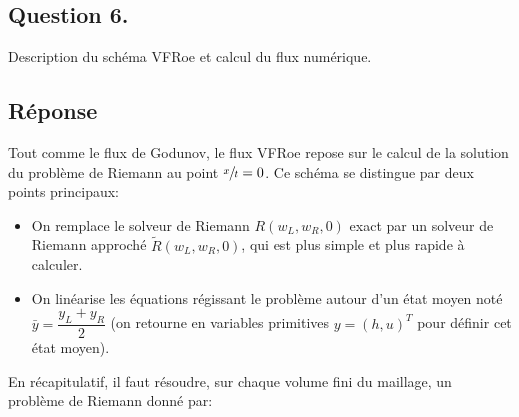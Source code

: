 \documentclass[
	french,
	11pt, %
]{fphw}
\begin{document}
\subsection*{Question 6.}
\begin{problem}
Description du schéma VFRoe et calcul du flux numérique. 
\end{problem}

\subsection*{Réponse} 
Tout comme le flux de Godunov, le flux VFRoe repose sur le calcul de la solution du problème de Riemann au point $\sfrac{x}{t}=0$. Ce schéma se distingue par deux points principaux:
\begin{itemize}
	\item On remplace le solveur de Riemann $R(w_L, w_R, 0)$ exact par un solveur de Riemann approché $\tilde{R}(w_L, w_R, 0)$, qui est plus simple et plus rapide à calculer.
	\item On linéarise les équations régissant le problème autour d'un état moyen noté $\bar{y} = \dfrac{y_L+y_R}{2}$ (on retourne en variables primitives $y=(h,u)^T$ pour définir cet état moyen).
\end{itemize}
En récapitulatif, il faut résoudre, sur chaque volume fini du maillage, un problème de Riemann donné par:
\end{document}
